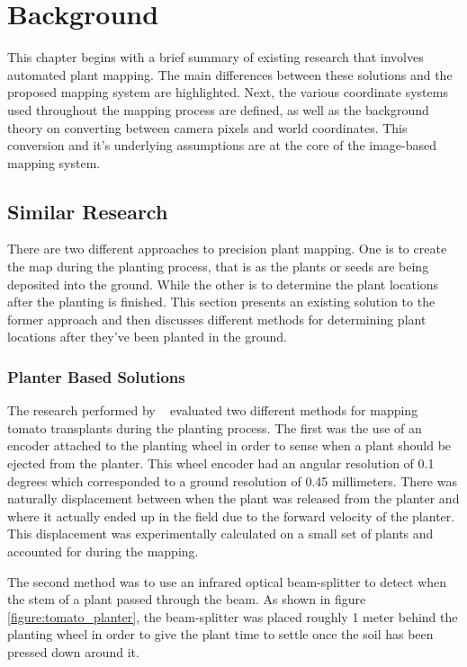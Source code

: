 
\cleardoublepage

\chapter{Background}
\label{background}

This chapter begins with a brief summary of existing research that involves automated plant mapping.  The main differences between these solutions and the proposed mapping system are highlighted.  Next, the various coordinate systems used throughout the mapping process are defined, as well as the background theory on converting between camera pixels and world coordinates.  This conversion and it's underlying assumptions are at the core of the image-based mapping system. 

\section{Similar Research}
\label{section:similar_research}

There are two different approaches to precision plant mapping.  One is to create the map during the planting process, that is as the plants or seeds are being deposited into the ground.  While the other is to determine the plant locations after the planting is finished.  This section presents an existing solution to the former approach and then discusses different methods for determining plant locations after they've been planted in the ground. 

\subsection{Planter Based Solutions}

The research performed by ~\citep{Sun:2010} evaluated two different methods for mapping tomato transplants during the planting process.  The first was the use of an encoder attached to the planting wheel in order to sense when a plant should be ejected from the planter. This wheel encoder had an angular resolution of 0.1 degrees which corresponded to a ground resolution of 0.45 millimeters.  There was naturally displacement between when the plant was released from the planter and where it actually ended up in the field due to the forward velocity of the planter.  This displacement was experimentally calculated on a small set of plants and accounted for during the mapping.  

The second method was to use an infrared optical beam-splitter to detect when the stem of a plant passed through the beam.  As shown in figure \ref{figure:tomato_planter}, the beam-splitter was placed roughly 1 meter behind the planting wheel in order to give the plant time to settle once the soil has been pressed down around it.  

